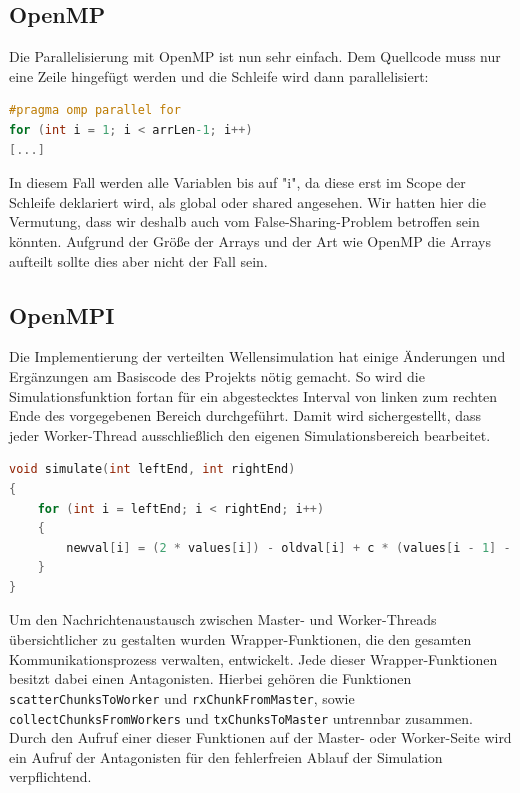 \subsection{OpenMP}
Die Parallelisierung mit OpenMP ist nun sehr einfach. Dem Quellcode muss nur eine Zeile hingefügt werden und die Schleife wird dann parallelisiert:

\begin{lstlisting}[language=C]
#pragma omp parallel for
for (int i = 1; i < arrLen-1; i++)
[...]
\end{lstlisting}

In diesem Fall werden alle Variablen bis auf "i", da diese erst im Scope der Schleife deklariert wird, als global oder shared angesehen. Wir hatten hier die Vermutung, dass wir deshalb auch vom False-Sharing-Problem betroffen sein könnten. Aufgrund der Größe der Arrays und der Art wie OpenMP die Arrays aufteilt sollte dies aber nicht der Fall sein.

\subsection{OpenMPI}
Die Implementierung der verteilten Wellensimulation hat einige Änderungen und Ergänzungen am Basiscode des Projekts nötig gemacht. So wird die Simulationsfunktion fortan für ein abgestecktes Interval von linken zum rechten Ende des vorgegebenen Bereich durchgeführt. Damit wird sichergestellt, dass jeder Worker-Thread ausschließlich den eigenen Simulationsbereich bearbeitet.

\begin{lstlisting}[language=C]
void simulate(int leftEnd, int rightEnd)
{
	for (int i = leftEnd; i < rightEnd; i++)
	{
		newval[i] = (2 * values[i]) - oldval[i] + c * (values[i - 1] - (2 * values[i]) + values[i + 1]);
	}
}
\end{lstlisting}

Um den Nachrichtenaustausch zwischen Master- und Worker-Threads übersichtlicher zu gestalten wurden Wrapper-Funktionen, die den gesamten Kommunikationsprozess verwalten, entwickelt. Jede dieser Wrapper-Funktionen besitzt dabei einen Antagonisten. Hierbei gehören die Funktionen \texttt{scatterChunksToWorker} und \texttt{rxChunkFromMaster}, sowie \texttt{collectChunksFromWorkers} und \texttt{txChunksToMaster} untrennbar zusammen. Durch den Aufruf einer dieser Funktionen auf der Master- oder Worker-Seite wird ein Aufruf der Antagonisten für den fehlerfreien Ablauf der Simulation verpflichtend.

